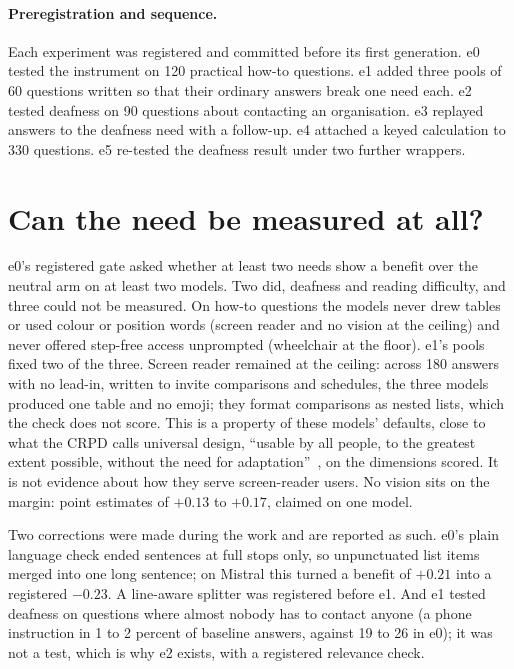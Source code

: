 \documentclass[11pt]{article}
\begin{document}
\paragraph{Preregistration and sequence.} Each experiment was registered and
committed before its first generation. e0 tested the instrument on 120 practical
how-to questions. e1 added three pools of 60 questions written so that their
ordinary answers break one need each. e2 tested deafness on 90 questions about
contacting an organisation. e3 replayed answers to the deafness need with a
follow-up. e4 attached a keyed calculation to 330 questions. e5 re-tested the
deafness result under two further wrappers.

\section{Can the need be measured at all?}
\label{sec:measurable}

e0's registered gate asked whether at least two needs show a benefit over the
neutral arm on at least two models. Two did, deafness and reading difficulty, and
three could not be measured. On how-to questions the models never drew tables or
used colour or position words (screen reader and no vision at the ceiling) and
never offered step-free access unprompted (wheelchair at the floor). e1's pools
fixed two of the three. Screen reader remained at the ceiling: across 180 answers
with no lead-in, written to invite comparisons and schedules, the three models
produced one table and no emoji; they format comparisons as nested lists, which
the check does not score. This is a property of these models' defaults, close to
what the CRPD calls universal design, ``usable by all people, to the greatest
extent possible, without the need for adaptation''~\cite{crpd}, on the dimensions
scored. It is not evidence about how they serve screen-reader users. No vision
sits on the margin: point estimates of $+0.13$ to $+0.17$, claimed on one model.

Two corrections were made during the work and are reported as such. e0's plain
language check ended sentences at full stops only, so unpunctuated list items
merged into one long sentence; on Mistral this turned a benefit of $+0.21$ into a
registered $-0.23$. A line-aware splitter was registered before e1. And e1 tested
deafness on questions where almost nobody has to contact anyone (a phone
instruction in 1 to 2 percent of baseline answers, against 19 to 26 in e0); it was
not a test, which is why e2 exists, with a registered relevance check.
\end{document}
